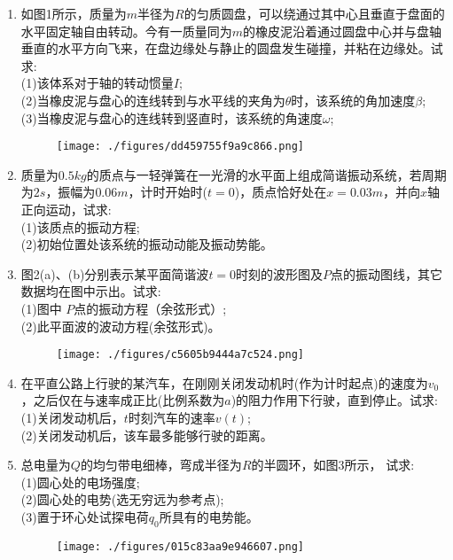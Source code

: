 
\begin{enumerate}
\item 如图1所示，质量为$m$半径为$R$的匀质圆盘，可以绕通过其中心且垂直于盘面的水平固定轴自由转动。今有一质量同为$m$的橡皮泥沿着通过圆盘中心并与盘轴垂直的水平方向飞来，在盘边缘处与静止的圆盘发生碰撞，并粘在边缘处。试求:\\
(1)该体系对于轴的转动惯量$I$;\\
(2)当橡皮泥与盘心的连线转到与水平线的夹角为$\theta$时，该系统的角加速度$\beta$;\\
(3)当橡皮泥与盘心的连线转到竖直时，该系统的角速度$\omega$;
\begin{figure}[ht]
\centering
\texttt{[image: ./figures/dd459755f9a9c866.png]}
\caption{} \label{fig_SD15_3}
\end{figure}
\item 质量为$0.5kg$的质点与一轻弹簧在一光滑的水平面上组成简谐振动系统，若周期为$2s$，振幅为$0.06m$，计时开始时($t=0$)，质点恰好处在$x=0.03m$，并向$x$轴正向运动，试求:\\
(1)该质点的振动方程;\\
(2)初始位置处该系统的振动动能及振动势能。
\item 图2(a)、(b)分别表示某平面简谐波$t=0$时刻的波形图及$ P$点的振动图线，其它数据均在图中示出。试求:\\
(1)图中 $P$点的振动方程（余弦形式）;\\
(2)此平面波的波动方程(余弦形式)。
\begin{figure}[ht]
\centering
\texttt{[image: ./figures/c5605b9444a7c524.png]}
\caption{} \label{fig_SD15_2}
\end{figure}
\item 在平直公路上行驶的某汽车，在刚刚关闭发动机时(作为计时起点)的速度为$ v_0$，之后仅在与速率成正比(比例系数为$a$)的阻力作用下行驶，直到停止。试求:\\
(1)关闭发动机后，$t$时刻汽车的速率$v(t)$;\\
(2)关闭发动机后，该车最多能够行驶的距离。
\item 总电量为$Q$的均匀带电细棒，弯成半径为$R$的半圆环，如图3所示，
试求:\\
(1)圆心处的电场强度;\\
(2)圆心处的电势(选无穷远为参考点);\\
(3)置于环心处试探电荷$q_0$所具有的电势能。
\begin{figure}[ht]
\centering
\texttt{[image: ./figures/015c83aa9e946607.png]}
\caption{} \label{fig_SD15_1}
\end{figure}
\end{enumerate}